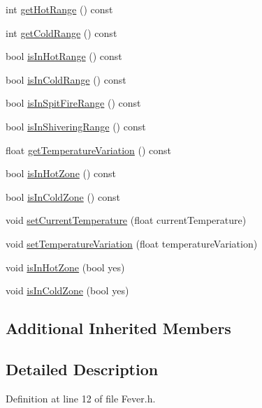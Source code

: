 \begin{DoxyCompactItemize}
\item 
int \hyperlink{class_symp_1_1_fever_a3f95180cef5a902c9d140bdc4221ac63}{get\-Hot\-Range} () const 
\item 
int \hyperlink{class_symp_1_1_fever_a8ab09855d72fdf728a69ef6ae7a9b6d7}{get\-Cold\-Range} () const 
\item 
bool \hyperlink{class_symp_1_1_fever_a36d0707dec3fc130d62035ef60c5547d}{is\-In\-Hot\-Range} () const 
\item 
bool \hyperlink{class_symp_1_1_fever_ab5103968b1de44e1690323967a845b2d}{is\-In\-Cold\-Range} () const 
\item 
bool \hyperlink{class_symp_1_1_fever_aa9082a2755202c26dcd349c2e029af42}{is\-In\-Spit\-Fire\-Range} () const 
\item 
bool \hyperlink{class_symp_1_1_fever_a78178d6f9a17aa5ce3b0bcbc215c5993}{is\-In\-Shivering\-Range} () const 
\item 
float \hyperlink{class_symp_1_1_fever_ab44e2e5879501aa7168dbcfa80a7e9ff}{get\-Temperature\-Variation} () const 
\item 
bool \hyperlink{class_symp_1_1_fever_ad81c2a8bf6d614ddb6dc5b37a482f74b}{is\-In\-Hot\-Zone} () const 
\item 
bool \hyperlink{class_symp_1_1_fever_ad04a411e253dd656758dff5ae6afd536}{is\-In\-Cold\-Zone} () const 
\item 
void \hyperlink{class_symp_1_1_fever_aa2debc949529c040a93e792f7b46d0c3}{set\-Current\-Temperature} (float current\-Temperature)
\item 
void \hyperlink{class_symp_1_1_fever_af6edc8ab259b9a9070b5adc3992d44c6}{set\-Temperature\-Variation} (float temperature\-Variation)
\item 
void \hyperlink{class_symp_1_1_fever_adedf92b0758ea2e09934e58fab2b993b}{is\-In\-Hot\-Zone} (bool yes)
\item 
void \hyperlink{class_symp_1_1_fever_ac60c84733ee37b52cea9d1f99b498500}{is\-In\-Cold\-Zone} (bool yes)
\end{DoxyCompactItemize}
\subsection*{Additional Inherited Members}


\subsection{Detailed Description}


Definition at line 12 of file Fever.\-h.




